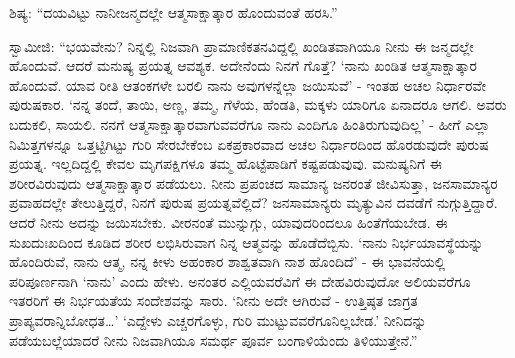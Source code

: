  ಶಿಷ್ಯ: “ದಯವಿಟ್ಟು ನಾನೀಜನ್ಮದಲ್ಲೇ ಆತ್ಮಸಾಕ್ಷಾತ್ಕಾರ ಹೊಂದುವಂತೆ ಹರಸಿ.” 

 ಸ್ವಾಮೀಜಿ: “ಭಯವೇನು? ನಿನ್ನಲ್ಲಿ ನಿಜವಾಗಿ ಪ್ರಾಮಾಣಿಕತನವಿದ್ದಲ್ಲಿ ಖಂಡಿತವಾಗಿಯೂ ನೀನು ಈ ಜನ್ಮದಲ್ಲೇ ಹೊಂದುವೆ. ಆದರೆ ಮನುಷ್ಯ ಪ್ರಯತ್ನ ಆವಶ್ಯಕ. ಅದೇನೆಂದು ನಿನಗೆ ಗೊತ್ತೆ? ‘ನಾನು ಖಂಡಿತ ಆತ್ಮಸಾಕ್ಷಾತ್ಕಾರ ಹೊಂದುವೆ. ಯಾವ ರೀತಿ ಆತಂಕಗಳೇ ಬರಲಿ ನಾನು ಅವುಗಳನ್ನೆಲ್ಲಾ ಜಯಿಸುವೆ’ - ಇಂತಹ ಅಚಲ ನಿರ್ಧಾರವೇ ಪುರುಷಕಾರ. ‘ನನ್ನ ತಂದೆ, ತಾಯಿ, ಅಣ್ಣ, ತಮ್ಮ, ಗೆಳೆಯ, ಹೆಂಡತಿ, ಮಕ್ಕಳು ಯಾರಿಗೂ ಏನಾದರೂ ಆಗಲಿ. ಅವರು ಬದುಕಲಿ, ಸಾಯಲಿ. ನನಗೆ ಆತ್ಮಸಾಕ್ಷಾತ್ಕಾರವಾಗುವವರೆಗೂ ನಾನು ಎಂದಿಗೂ ಹಿಂತಿರುಗುವುದಿಲ್ಲ’ - ಹೀಗೆ ಎಲ್ಲಾ ನಿಮಿತ್ತಗಳನ್ನೂ ಒತ್ತಟ್ಟಿಗಿಟ್ಟು ಗುರಿ ಸೇರಬೇಕೆಂಬ ಏಕಪ್ರಕಾರವಾದ ಅಚಲ ನಿರ್ಧಾರದಿಂದ ಹೊರಡುವುದೇ ಪುರುಷ ಪ್ರಯತ್ನ. ಇಲ್ಲದಿದ್ದಲ್ಲಿ ಕೇವಲ ಮೃಗಪಕ್ಷಿಗಳೂ ತಮ್ಮ ಹೊಟ್ಟೆಪಾಡಿಗೆ ಕಷ್ಟಪಡುವುವು. ಮನುಷ್ಯನಿಗೆ ಈ ಶರೀರವಿರುವುದು ಆತ್ಮಸಾಕ್ಷಾತ್ಕಾರ ಪಡೆಯಲು. ನೀನು ಪ್ರಪಂಚದ ಸಾಮಾನ್ಯ ಜನರಂತೆ ಜೀವಿಸುತ್ತಾ, ಜನಸಾಮಾನ್ಯರ ಪ್ರವಾಹದಲ್ಲೇ ತೇಲುತ್ತಿದ್ದರೆ, ನಿನಗೆ ಪುರುಷ ಪ್ರಯತ್ನವೆಲ್ಲಿದೆ? ಜನಸಾಮಾನ್ಯರು ಮೃತ್ಯುವಿನ ದವಡೆಗೆ ನುಗ್ಗುತ್ತಿದ್ದಾರೆ. ಆದರೆ ನೀನು ಅದನ್ನು ಜಯಿಸಬೇಕು. ವೀರನಂತೆ ಮುನ್ನುಗ್ಗು, ಯಾವುದರಿಂದಲೂ ಹಿಂತೆಗೆಯಬೇಡ. ಈ ಸುಖದುಃಖದಿಂದ ಕೂಡಿದ ಶರೀರ ಲಭಿಸಿರುವಾಗ ನಿನ್ನ ಆತ್ಮವನ್ನು ಹೊಡೆದೆಬ್ಬಿಸು. ‘ನಾನು ನಿರ್ಭಯಾವಸ್ಥೆಯನ್ನು ಹೊಂದಿರುವೆ, ನಾನು ಆತ್ಮ, ನನ್ನ ಕೀಳು ಅಹಂಕಾರ ಶಾಶ್ವತವಾಗಿ ನಾಶ ಹೊಂದಿದೆ’ - ಈ ಭಾವನೆಯಲ್ಲಿ ಪರಿಪೂರ್ಣನಾಗಿ ‘ನಾನು’ ಎಂದು ಹೇಳು. ಅನಂತರ ಎಲ್ಲಿಯವರೆವಿಗೆ ಈ ದೇಹವಿರುವುದೋ ಅಲಿಯವರೆಗೂ ಇತರರಿಗೆ ಈ ನಿರ್ಭಯತೆಯ ಸಂದೇಶವನ್ನು ಸಾರು. ‘ನೀನು ಅದೇ ಆಗಿರುವೆ - ಉತ್ತಿಷ್ಠತ ಜಾಗ್ರತ ಪ್ರಾಪ್ಯವರಾನ್ನಿಬೋಧತ…’ ‘ಎದ್ದೇಳು ಎಚ್ಚರಗೊಳ್ಳು, ಗುರಿ ಮುಟ್ಟುವವರೆಗೂ‌ನಿಲ್ಲಬೇಡ.’ ನೀನಿದನ್ನು ಪಡೆಯಬಲ್ಲೆಯಾದರೆ ನೀನು ನಿಜವಾಗಿಯೂ ಸಮರ್ಥ ಪೂರ್ವ ಬಂಗಾಳಿಯೆಂದು ತಿಳಿಯುತ್ತೇನೆ.” 

